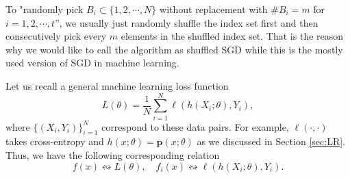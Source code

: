 To "randomly pick $B_i \subset \{1, 2, \cdots, N \}$ without replacement
with $\# B_i = m$ for $i = 1,2,\cdots,t$'', we usually just randomly shuffle the index set first and
then consecutively pick every $m$ elements in the shuffled index set. That is the reason why we  
would like to call the algorithm as shuffled SGD while this is the mostly used version of SGD in machine learning.

\begin{remark}	
Let us recall a general machine learning loss function
\begin{equation}\label{key}
L(\theta) = \frac{1}{N}\sum_{i=1}^N \ell(h(X_i; \theta), Y_i),
\end{equation}
where $\{(X_i, Y_i)\}_{i=1}^N$ correspond to these data pairs. 
For example, $\ell(\cdot, \cdot)$ takes cross-entropy and $h(x; \theta) = \bm p(x;\theta)$ as we discussed in Section \ref{sec:LR}.  
Thus, we have the following corresponding relation
\begin{equation*} 
f(x) \leftrightsquigarrow L(\theta), \quad
f_i(x) \leftrightsquigarrow \ell(h(X_i; \theta), Y_i). 
\end{equation*}
\end{remark}



\endinput
Here we can take the expectation of $i_t$ independently from $\{x_i, i = 1,\ldots,t\}$
to obtain the second line of (\ref{equ:L2SGD}) since $i_t$ is independent from 
$\{x_i, i = 1,\ldots,t\}$ which is completely determined by $\{i_j, j = 1,\ldots,t - 1\}$.
And the third line of (\ref{equ:L2SGD}) is obtained from the boundness of the gradients.

Here shuffle  index and get mini-batch $B_1, \cdots, B_{\frac{N}{m}}$ means that $\# B_i = m$ and 
\begin{equation}\label{key}
\{1, 2, \cdots, N\} = \cup_{i = 1}^{\frac{N}{m}} B_i,  \quad B_i \cap B_j = \emptyset
\end{equation}
where $B_i$ is chosen from $\{1, 2, \cdots, N\}$ randomly.

